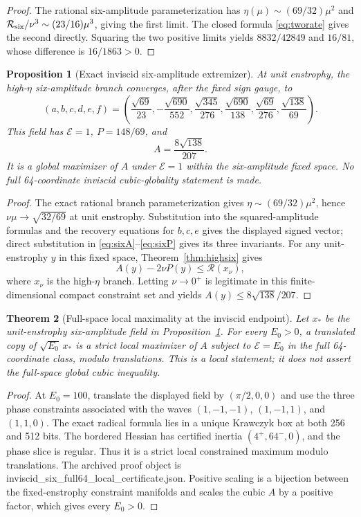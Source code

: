 \documentclass[11pt]{article}
\newtheorem{theorem}{Theorem}[section]
\newtheorem{proposition}[theorem]{Proposition}
\newcommand{\E}{\mathcal{E}}
\newcommand{\rate}{\mathcal{R}}
\begin{document}
\begin{proof}
The rational six-amplitude parameterization has
$\eta(\mu)\sim(69/32)\mu^2$ and
$\rate_{\rm six}/\nu^3\sim(23/16)\mu^3$, giving the first limit.  The
closed formula \eqref{eq:tworate} gives the second directly.  Squaring the
two positive limits yields $8832/42849$ and $16/81$, whose difference is
$16/1863>0$.
\end{proof}

\begin{proposition}[Exact inviscid six-amplitude extremizer]
\label{prop:inviscidsix}
At unit enstrophy, the high-$\eta$ six-amplitude branch converges, after the
fixed sign gauge, to
\[
 (a,b,c,d,e,f)=
 \left(\frac{\sqrt{69}}{23},-\frac{\sqrt{690}}{552},
 \frac{\sqrt{345}}{276},\frac{\sqrt{690}}{138},
 \frac{\sqrt{69}}{276},\frac{\sqrt{138}}{69}\right).
\]
This field has $\E=1$, $P=148/69$, and
\[
 A=\frac{8\sqrt{138}}{207}.
\]
It is a global maximizer of $A$ under $\E=1$ within the six-amplitude fixed
space.  No full 64-coordinate inviscid cubic-globality statement is made.
\end{proposition}

\begin{proof}
The exact rational branch parameterization gives
$\eta\sim(69/32)\mu^2$, hence $\nu\mu\to\sqrt{32/69}$ at unit enstrophy.
Substitution into the squared-amplitude formulas and the recovery equations
for $b,c,e$ gives the displayed signed vector; direct substitution in
\eqref{eq:sixA}--\eqref{eq:sixP} gives its three invariants.  For any
unit-enstrophy $y$ in this fixed space, Theorem~\ref{thm:highsix} gives
\[
 A(y)-2\nu P(y)\leq \rate(x_\nu),
\]
where $x_\nu$ is the high-$\eta$ branch.  Letting $\nu\to0^+$ is legitimate
in this finite-dimensional compact constraint set and yields
$A(y)\leq8\sqrt{138}/207$.
\end{proof}

\begin{theorem}[Full-space local maximality at the inviscid endpoint]
\label{thm:inviscidlocal}
Let $x_*$ be the unit-enstrophy six-amplitude field in
Proposition~\ref{prop:inviscidsix}. For every $E_0>0$, a translated copy of
$\sqrt{E_0}\,x_*$ is a strict local maximizer of $A$ subject to $\E=E_0$ in
the full 64-coordinate class, modulo translations. This is a local statement;
it does not assert the full-space global cubic inequality.
\end{theorem}

\begin{proof}
At $E_0=100$, translate the displayed field by $(\pi/2,0,0)$ and use the
three phase constraints associated with the waves
$(1,-1,-1)$, $(1,-1,1)$, and $(1,1,0)$. The exact radical formula lies in a
unique Krawczyk box at both 256 and 512 bits. The bordered Hessian has certified
inertia $(4^+,64^-,0)$, and the phase slice is regular. Thus it is a strict
local constrained maximum modulo translations. The archived proof object is
{\ttfamily inviscid\_six\_full64\_local\_certificate.json}. Positive scaling
is a bijection between the fixed-enstrophy constraint manifolds and scales the
cubic $A$ by a positive factor, which gives every $E_0>0$.
\end{proof}
\end{document}
